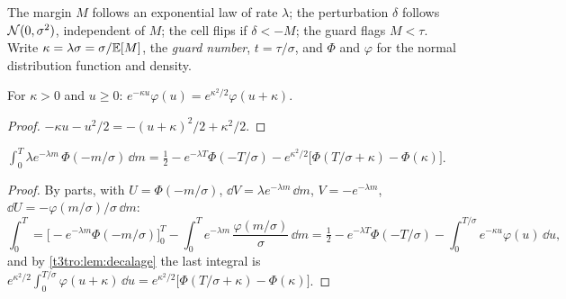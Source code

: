 \begin{hypothese}\label{t3tro:hyp:homogene}
The margin $M$ follows an exponential law of rate $\lambda$; the perturbation $\delta$ follows $\mathcal{N}(0, \sigma^2)$, independent of $M$; the cell flips if $\delta < -M$; the guard flags $M < \tau$. Write $\kappa = \lambda\sigma = \sigma/\mathbb{E}[M]$, the \emph{guard number}, $t = \tau/\sigma$, and $\Phi$ and $\varphi$ for the normal distribution function and density.
\end{hypothese}

\begin{lemme}\label{t3tro:lem:decalage}
For $\kappa > 0$ and $u \ge 0$: $e^{-\kappa u}\varphi(u) = e^{\kappa^2/2}\varphi(u + \kappa)$.
\end{lemme}
\begin{proof}
$-\kappa u - u^2/2 = -(u + \kappa)^2/2 + \kappa^2/2$.
\end{proof}

\begin{lemme}\label{t3tro:lem:integrale}
$\displaystyle\int_0^T \lambda e^{-\lambda m}\,\Phi(-m/\sigma)\,\dd m = \tfrac12 - e^{-\lambda T}\Phi(-T/\sigma) - e^{\kappa^2/2}\bigl[\Phi(T/\sigma + \kappa) - \Phi(\kappa)\bigr]$.
\end{lemme}
\begin{proof}
By parts, with $U = \Phi(-m/\sigma)$, $\dd V = \lambda e^{-\lambda m}\,\dd m$, $V = -e^{-\lambda m}$, $\dd U = -\varphi(m/\sigma)/\sigma\,\dd m$:
\[
\int_0^T = \bigl[-e^{-\lambda m}\Phi(-m/\sigma)\bigr]_0^T - \int_0^T e^{-\lambda m}\,\frac{\varphi(m/\sigma)}{\sigma}\,\dd m = \tfrac12 - e^{-\lambda T}\Phi(-T/\sigma) - \int_0^{T/\sigma} e^{-\kappa u}\varphi(u)\,\dd u ,
\]
and by \cref{t3tro:lem:decalage} the last integral is $e^{\kappa^2/2}\int_0^{T/\sigma}\varphi(u + \kappa)\,\dd u = e^{\kappa^2/2}\bigl[\Phi(T/\sigma + \kappa) - \Phi(\kappa)\bigr]$.
\end{proof}

